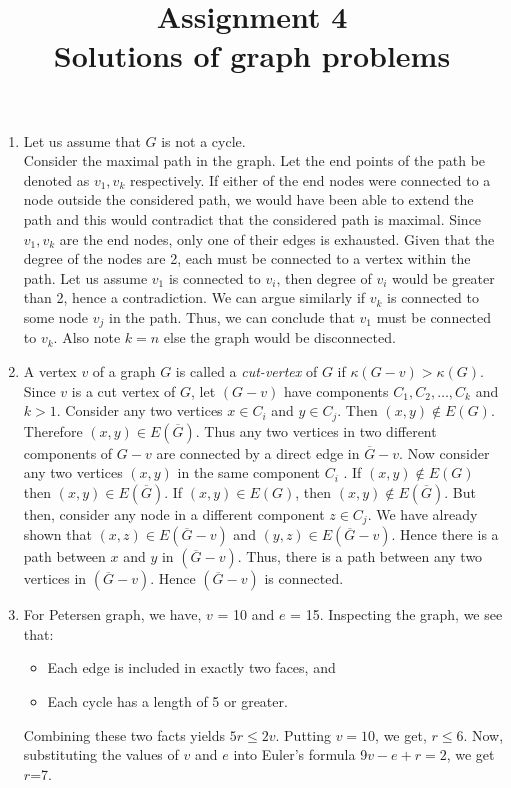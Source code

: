 \documentclass{article}
\title{Assignment 4\\ Solutions of graph problems}
\date{}
\begin{document}
\maketitle
\begin{enumerate}

\item Let us assume that $G$ is not a cycle. \\
Consider the maximal path in the graph. Let the end points of the path be denoted as $v_1,v_k$ respectively. If either of the end nodes were connected to a node outside the considered path, we would have been able to extend the path and this would contradict that the considered path is maximal. Since $v_1,v_k$ are the end nodes, only one of their edges is exhausted. Given that the degree of the nodes are 2, each must be connected to a vertex within the path. Let us assume $v_1$ is connected to $v_i$, then degree of $v_i$ would be greater than 2, hence a contradiction. We can argue similarly if $v_k$ is connected to some node $v_j$ in the path. Thus, we can conclude that $v_1$ must be connected to $v_k$. Also note $k=n$ else the graph would be disconnected.




\item A vertex $v$ of a graph $G$ is called a \textit{cut-vertex} of $G$ if $\kappa(G-v) > \kappa(G)$.\\
Since $v$ is a cut vertex of $G$, let $(G-v)$ have components $C_1, C_2, \dots , C_k$ and $k > 1$. Consider any two vertices $x\in C_i$ and $y\in C_j$.
Then $(x,y) \notin E(G)$. Therefore $(x,y) \in E(\overline{G})$. Thus any two vertices in two different components of $G-v$ are connected by a direct edge in $\overline{G}-v$. Now consider any two vertices $(x,y)$ in the same component $C_i$ . If $(x,y) \notin E(G)$ then $(x,y) \in E(\overline{G})$. If $(x, y) \in E(G)$, then $(x,y) \notin E(\overline{G})$. But then, consider any node in a different component $z \in C_j$.
We have already shown that $(x, z) \in E(\overline{G}-v)$ and $(y,z) \in E(\overline{G}-v)$. Hence there is a path between $x$ and $y$ in $(\overline{G}-v)$. Thus, there is a path between any two vertices in $(\overline{G}-v)$. Hence $(\overline{G}-v)$ is connected.

\item For Petersen graph, we have, $v$ = 10 and $e$ = 15. Inspecting the graph, we see that: 

\begin{itemize}
\item Each edge is included in exactly two faces, and 
\item Each cycle has a length of 5 or greater. 
\end{itemize}
Combining these two facts yields $5r\le2v$. Putting $v=10$, we get, $r\le6$.
Now, substituting the values of $v$ and $e$ into Euler's formula 9$v-e+r=2$, we get $r$=7. 


\end{enumerate}
\end{document}
